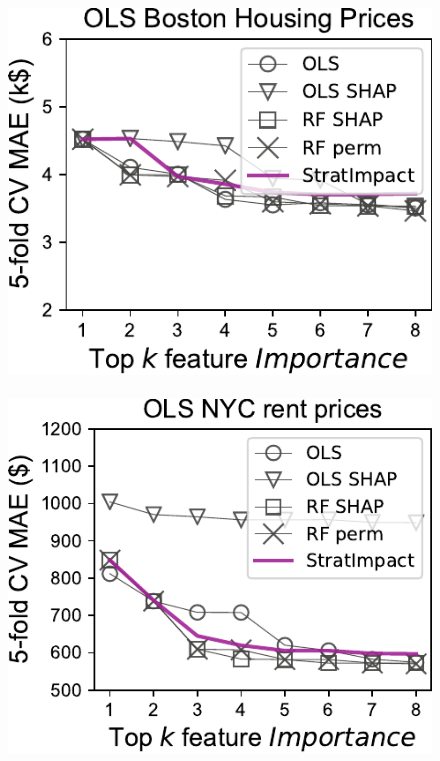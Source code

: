 \documentclass[11pt]{article}
\begin{document}
\begin{figure}[htbp]
\begin{center}
\includegraphics[scale=0.5]{images/boston-topk-OLS-Importance.pdf}~~~
\includegraphics[scale=0.5]{images/rent-topk-OLS-Importance.pdf}
\label{fig:OLS}
\end{center}
\end{figure}
\end{document}
